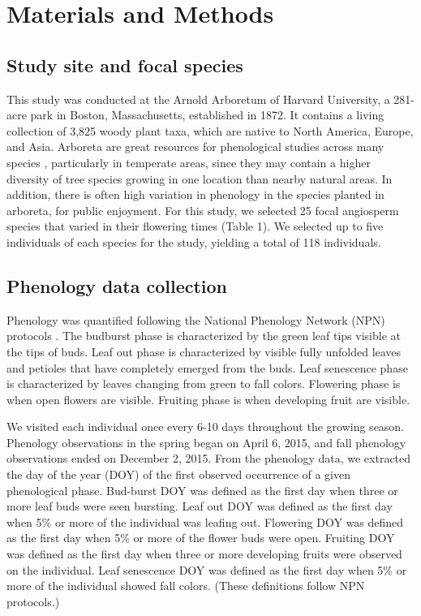 \documentclass{article}
\begin{document}
\section* {Materials and Methods}
\subsection*{Study site and focal species}
This study was conducted at the Arnold Arboretum of Harvard University, a 281-acre park in Boston, Massachusetts, established in 1872. It contains a living collection of 3,825 woody plant taxa, which are native to North America, Europe, and Asia. Arboreta are great resources for phenological studies across many species \citep{primack2009a}, particularly in temperate areas, since they may contain a higher diversity of tree species growing in one location than nearby natural areas. In addition, there is often high variation in phenology in the species planted in arboreta, for public enjoyment. For this study, we selected 25 focal angiosperm species that varied in their flowering times (Table 1). We selected up to five individuals of each species for the study, yielding a total of 118 individuals.

\subsection*{Phenology data collection}
Phenology was quantified following the National Phenology Network (NPN) protocols \citep{denny2014}. The budburst phase is characterized by the green leaf tips visible at the tips of buds. Leaf out phase is characterized by visible fully unfolded leaves and petioles that have completely emerged from the buds. Leaf senescence phase is characterized by leaves changing from green to fall colors. Flowering phase is when open flowers are visible. Fruiting phase is when developing fruit are visible. 
\par We visited each individual once every 6-10 days throughout the growing season. Phenology observations in the spring began on April 6, 2015, and fall phenology observations ended on December 2, 2015.
From the phenology data, we extracted the day of the year (DOY) of the first observed occurrence of a given phenological phase. Bud-burst DOY was defined as the first day when three or more leaf buds were seen bursting. Leaf out DOY was defined as the first day when 5\% or more of the individual was leafing out. Flowering DOY was defined as the first day when 5\% or more of the flower buds were open. Fruiting DOY was defined as the first day when three or more developing fruits were observed on the individual. Leaf senescence DOY was defined as the first day when 5\% or more of the individual showed fall colors. (These definitions follow NPN protocols.)
\end{document}
